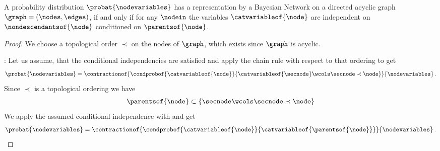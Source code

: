 \begin{theorem}
    \label{the:condIndBN}
    A probability distribution $\probat{\nodevariables}$ has a representation by a Bayesian Network on a directed acyclic graph $\graph=(\nodes,\edges)$, if and only if for any $\nodein$ the variables $\catvariableof{\node}$ are independent on $\nondescendantsof{\node}$ conditioned on $\parentsof{\node}$.
\end{theorem}
\begin{proof}
    We choose a topological order $\prec$ on the nodes of $\graph$, which exists since $\graph$ is acyclic.

    \proofrightsymbol:
    Let us assume, that the conditional independencies are satisfied and apply the chain rule with respect to that ordering to get
    \begin{align*}
        \probat{\nodevariables} =
        \contractionof{
            \condprobof{\catvariableof{\node}}{\catvariableof{\secnode} \wcols \secnode \prec \node}
        }
        {\nodevariables} \, .
    \end{align*}
    Since $\prec$ is a topological ordering we have
    \[ \parentsof{\node} \subset \{\secnode \wcols \secnode \prec \node\} \]
    We apply the assumed conditional independence with  and get
    \begin{align*}
        \probat{\nodevariables} =
        \contractionof{
            \condprobof{\catvariableof{\node}}{\catvariableof{\parentsof{\node}}}
        }
        {\nodevariables} \, .
    \end{align*}


\end{proof}
